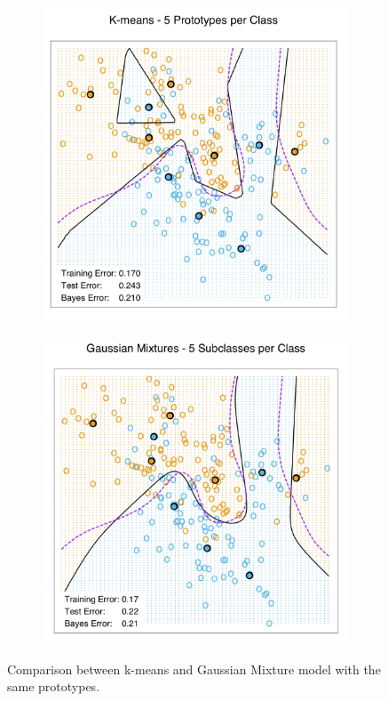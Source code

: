 \documentclass[12pt, letterpaper]{article}
\theoremstyle{definition}
\begin{document}
\begin{figure}
\begin{subfigure}{0.49\textwidth}
\centering
\includegraphics[width=1\linewidth]{img/kmeans}
\end{subfigure}
\hfill
\begin{subfigure}{0.49\textwidth}
\centering
\includegraphics[width=1\linewidth]{img/GaussianMix}
\end{subfigure}
\caption{Comparison between k-means and Gaussian Mixture model with the same prototypes.}
\end{figure}
\end{document}
